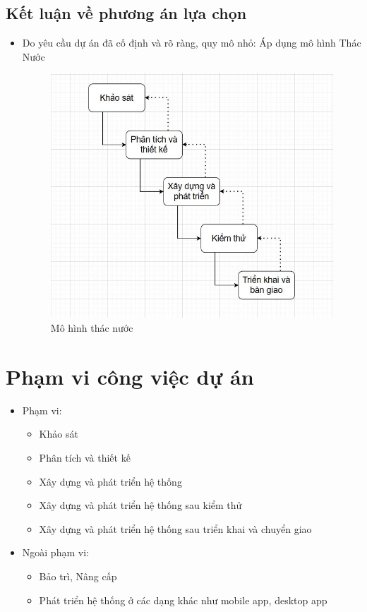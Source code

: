 \subsection{Kết luận về phương án lựa chọn}
\begin{itemize}
    \item Do yêu cầu dự án đã cố định và rõ ràng, quy mô nhỏ: Áp dụng mô hình Thác Nước
    \begin{figure}[H]
        \centering
        \includegraphics[width=\textwidth]{images/waterfall.png}
        \caption{Mô hình thác nước}
        \label{fig:usecase-tong-quat}
    \end{figure}
\end{itemize}

\section{Phạm vi công việc dự án}
\begin{itemize}
    \item Phạm vi:
\begin{itemize}
    \item Khảo sát
    \item Phân tích và thiết kế
    \item Xây dựng và phát triển hệ thống
    \item Xây dựng và phát triển hệ thống sau kiểm thử
    \item Xây dựng và phát triển hệ thống sau triển khai và chuyển giao
\end{itemize}
\end{itemize}
\begin{itemize}
\item Ngoài phạm vi:
\begin{itemize}
    \item Bảo trì, Nâng cấp
    \item Phát triển hệ thống ở các dạng khác như mobile app, desktop app
\end{itemize}
\end{itemize}

